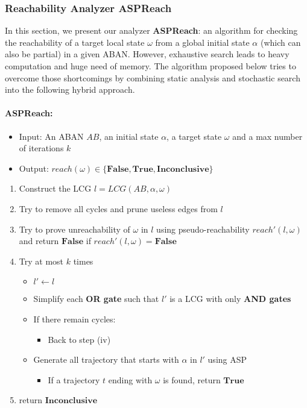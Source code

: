 \subsubsection{Reachability Analyzer ASPReach}
In this section, we present our analyzer \textbf{ASPReach}: an algorithm for checking the reachability of a target local state $\omega$ from a global initial state $\alpha$ (which can also be partial) in a given ABAN.
However, exhaustive search leads to heavy computation and huge need of memory.
The algorithm proposed below tries to overcome those shortcomings by combining static analysis and stochastic search into the following hybrid approach.


\paragraph{{\bf ASPReach}:}

\begin{itemize}
    \item Input: An ABAN $AB$, an initial state $\alpha$, a target state $\omega$ and a max number of iterations $k$
    \item Output: $reach(\omega)\in\{\mathbf{False},\mathbf{True},\mathbf{Inconclusive}\}$
\end{itemize}
\begin{enumerate}
    \item Construct the LCG $l=LCG(AB,\alpha,\omega)$
    \item Try to remove all cycles and prune useless edges from $l$
    \item Try to prove unreachability of $\omega$ in $l$ using pseudo-reachability $reach'(l,\omega)$ and return $\mathbf{False}$ if $reach'(l,\omega)=\textbf{False}$
    \item Try at most $k$ times
    \begin{itemize}
    \item $l'\gets l$
    \item Simplify each \textbf{OR gate} such that $l'$ is a LCG with only \textbf{AND gates}
    \item If there remain cycles:
        \begin{itemize}
            \item Back to step (iv)
        \end{itemize}
    \item Generate all trajectory that starts with $\alpha$ in $l'$ using ASP
    \begin{itemize}
        \item If a trajectory $t$ ending with $\omega$ is found, return $\mathbf{True}$
    \end{itemize}
    \end{itemize}
    \item return $\mathbf{Inconclusive}$
\end{enumerate}

